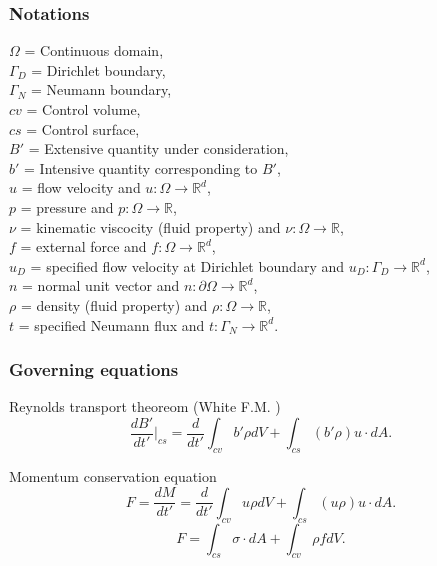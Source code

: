 \documentclass{beamer}
\begin{document}
\begin{frame}
\frametitle{Notations}
$\Omega$ = Continuous domain,\\
$\Gamma_D$ = Dirichlet boundary, \\
$\Gamma_N$ = Neumann boundary, \\
$cv$ = Control volume,\\
$cs$ = Control surface,\\
$B'$ = Extensive quantity under consideration,\\
$b'$ = Intensive quantity corresponding to $B'$,\\
$u$ = flow velocity and $u:\Omega \rightarrow \mathbb{R}^d$,\\
$p$ = pressure and $p:\Omega \rightarrow \mathbb{R}$,\\
$\nu$ = kinematic viscocity (fluid property) and $\nu:\Omega \rightarrow \mathbb{R}$,\\ 
$f$ = external force and $f:\Omega \rightarrow \mathbb{R}^d$,\\
$u_D$ = specified flow velocity at Dirichlet boundary and $u_D:\Gamma_D \rightarrow \mathbb{R}^d$,\\
$n$ = normal unit vector and $n:\partial \Omega \rightarrow \mathbb{R}^d$,\\
$\rho$ = density (fluid property) and $\rho:\Omega \rightarrow \mathbb{R}$,\\
$t$ = specified Neumann flux and $t:\Gamma_N \rightarrow \mathbb{R}^d$.\\
\end{frame}


\begin{frame}
\frametitle{Governing equations}

\begin{block}{Reynolds transport theoreom (White F.M. \cite{white})} 
\begin{equation} \label{rtt} 
\frac{dB'}{dt'}|_{cs} = \frac{d}{dt'} \int_{cv} b' \rho dV + \int_{cs} (b' \rho) u\cdot dA \textrm{.}
\end{equation}
\end{block}

\begin{block}{Momentum conservation equation}
\begin{equation}\label{External force lhs}
F = \frac{dM}{dt'} = \frac{d}{dt'} \int_{cv} u \rho dV + \int_{cs} (u \rho) u\cdot dA \textrm{.}
\end{equation}
\begin{equation}\label{External force rhs}
F = \int_{cs} \sigma \cdot dA + \int_{cv} \rho f dV \textrm{.}
\end{equation}
\end{block}

\end{frame}
\end{document}
